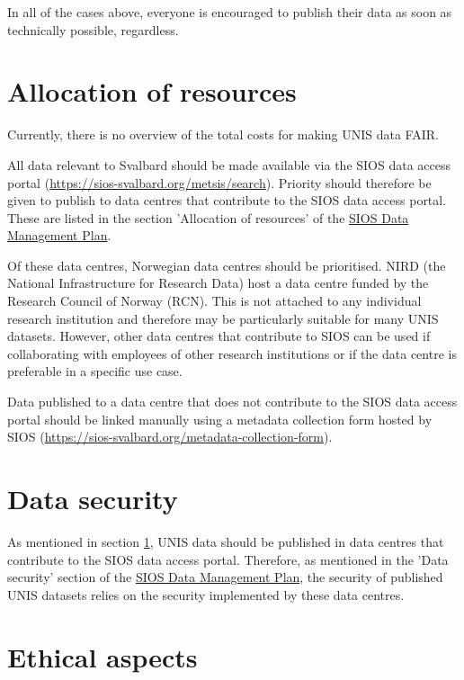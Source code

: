 \documentclass[a4paper,english, 11pt]{article}
\begin{document}
In all of the cases above, everyone is encouraged to publish their data as soon as technically possible, regardless.

\section{Allocation of resources}
\label{s:resources}

Currently, there is no overview of the total costs for making UNIS data FAIR. 

All data relevant to Svalbard should be made available via the SIOS data access portal (\url{https://sios-svalbard.org/metsis/search}). Priority should therefore be given to publish to data centres that contribute to the SIOS data access portal. These are listed in the section 'Allocation of resources' of the \href{https://sios-svalbard.org/sites/sios-svalbard.org/files/common/SIOS_Data_Management_Plan.pdf}{SIOS Data Management Plan}.

Of these data centres, Norwegian data centres should be prioritised. NIRD (the National Infrastructure for Research Data) host a data centre funded by the Research Council of Norway (RCN). This is not attached to any individual research institution and therefore may be particularly suitable for many UNIS datasets. However, other data centres that contribute to SIOS can be used if collaborating with employees of other research institutions or if the data centre is preferable in a specific use case.

Data published to a data centre that does not contribute to the SIOS data access portal should be linked manually using a metadata collection form hosted by SIOS (\url{https://sios-svalbard.org/metadata-collection-form}).  

\section{Data security}
\label{s:security}

As mentioned in section \ref{s:resources}, UNIS data should be published in data centres that contribute to the SIOS data access portal. Therefore, as mentioned in the 'Data security' section of the \href{https://sios-svalbard.org/sites/sios-svalbard.org/files/common/SIOS_Data_Management_Plan.pdf}{SIOS Data Management Plan}, the security of published UNIS datasets relies on the security implemented by these data centres.

\section{Ethical aspects}
\label{s:ethics}
\end{document}
